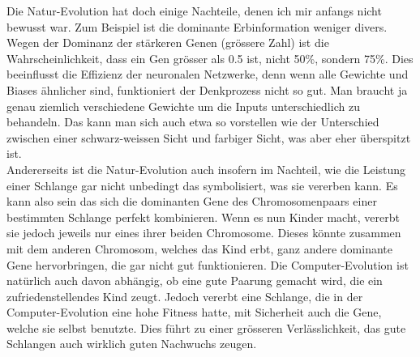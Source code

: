\documentclass[10pt,a4paper,ngerman,english]{article}
\begin{document}
Die Natur-Evolution hat doch einige Nachteile, denen ich mir anfangs nicht bewusst war. Zum Beispiel ist die dominante Erbinformation weniger divers. Wegen der Dominanz der stärkeren Genen (grössere Zahl) ist die Wahrscheinlichkeit, dass ein Gen grösser als 0.5 ist, nicht 50\%, sondern 75\%. Dies beeinflusst die Effizienz der neuronalen Netzwerke, denn wenn alle Gewichte und Biases ähnlicher sind, funktioniert der Denkprozess nicht so gut. Man braucht ja genau ziemlich verschiedene Gewichte um die Inputs unterschiedlich zu behandeln. Das kann man sich auch etwa so vorstellen wie der Unterschied zwischen einer schwarz-weissen Sicht und farbiger Sicht, was aber eher überspitzt ist.\\

Andererseits ist die Natur-Evolution auch insofern im Nachteil, wie die Leistung einer Schlange gar nicht unbedingt das symbolisiert, was sie vererben kann. Es kann also sein das sich die dominanten Gene des Chromosomenpaars einer bestimmten Schlange perfekt kombinieren. Wenn es nun Kinder macht, vererbt sie jedoch jeweils nur eines ihrer beiden Chromosome. Dieses könnte zusammen mit dem anderen Chromosom, welches das Kind erbt, ganz andere dominante Gene hervorbringen, die gar nicht gut funktionieren. Die Computer-Evolution ist natürlich auch davon abhängig, ob eine gute Paarung gemacht wird, die ein zufriedenstellendes Kind zeugt. Jedoch vererbt eine Schlange, die in der Computer-Evolution eine hohe Fitness hatte, mit Sicherheit auch die Gene, welche sie selbst benutzte. Dies führt zu einer grösseren Verlässlichkeit, das gute Schlangen auch wirklich guten Nachwuchs zeugen.\\
\end{document}
